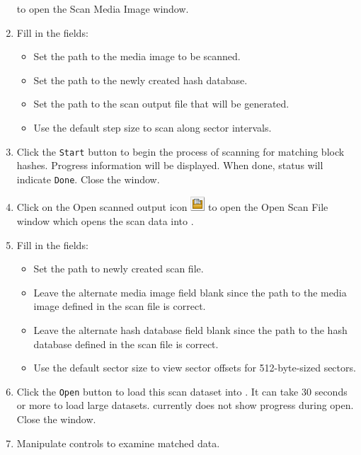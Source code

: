 \documentclass[11pt,fleqn]{article} %
\begin{document}
\begin{enumerate}
to open the \sscope Scan Media Image window.
\item Fill in the fields:
  \begin{itemize}
  \item Set the path to the media image to be scanned.
  \item Set the path to the newly created hash database.
  \item Set the path to the scan output file that will be generated.
  \item Use the default step size to scan along sector intervals.
  \end{itemize}
\item Click the \verb+Start+ button to begin the process of scanning for matching block hashes. Progress information will be displayed. When done, status will indicate \verb+Done+. Close the window.
\item Click on the Open scanned output icon
\includegraphics[scale=.4]{screenshots/open_scanned_output_icon}
to open the Open Scan File window which opens the scan data into \sscope.
\item Fill in the fields:
  \begin{itemize}
  \item Set the path to newly created scan file.
  \item Leave the alternate media image field blank since the path to the media image defined in the scan file is correct.
  \item Leave the alternate hash database field blank since the path to the hash database defined in the scan file is correct.
  \item Use the default sector size to view sector offsets for 512-byte-sized sectors.
  \end{itemize}
\item Click the \verb+Open+ button to load this scan dataset into \sscope. It can take 30 seconds or more to load large datasets. \sscope currently does not show progress during open. Close the window.
\item Manipulate \sscope controls to examine matched data.
\end{enumerate}
\end{document}
